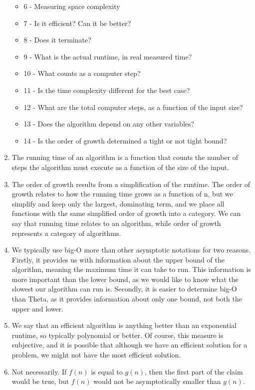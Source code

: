 \documentclass{article}
\begin{document}
\begin{enumerate}
\begin{itemize}
		\item 6 - Measuring space complexity
		\item 7 - Is it efficient? Can it be better?
		\item 8 - Does it terminate?
		\item 9 - What is the actual runtime, in real measured time?
		\item 10 - What counts as a computer step?
		\item 11 - Is the time complexity different for the best case?
		\item 12 - What are the total computer steps, as a function of the input size?
		\item 13 - Does the algorithm depend on any other variables?
		\item 14 - Is the order of growth determined a tight or not tight bound?
	\end{itemize}
	\item The running time of an algorithm is a function that counts the number of steps the algorithm must execute as a function of the size of the input.
	\item The order of growth results from a simplification of the runtime. The order of growth relates to how the running time grows as a function of n, but we simplify and keep only the largest, dominating term, and we place all functions with the same simplified order of growth into a category. We can say that running time relates to an algorithm, while order of growth represents a category of algorithms.
	\item We typically use big-O more than other asymptotic notations for two reasons. Firstly, it provides us with information about the upper bound of the algorithm, meaning the maximum time it can take to run. This information is more important than the lower bound, as we would like to know what the slowest our algorithm can run is. Secondly, it is easier to determine big-O than Theta, as it provides information about only one bound, not both the upper and lower.
	\item We say that an efficient algorithm is anything better than an exponential runtime, so typically polynomial or better. Of course, this measure is subjective, and it is possible that although we have an efficient solution for a problem, we might not have the most efficient solution.
	\item Not necessarily. If $f(n)$ is equal to $g(n)$, then the first part of the claim would be true, but $f(n)$ would not be asymptotically smaller than $g(n)$.
	
\end{enumerate}
	
\end{document}
